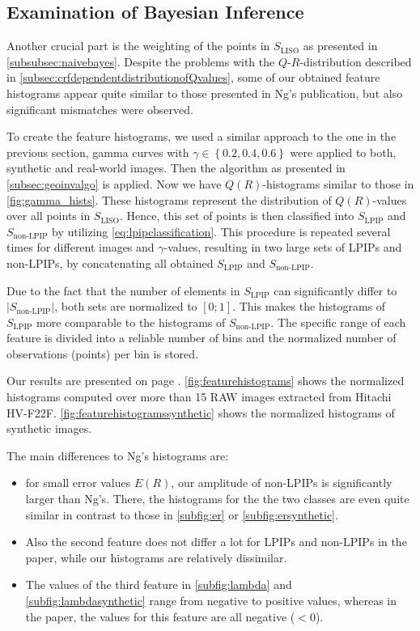 \clearpage

\subsection{Examination of Bayesian Inference}
\label{subsec:examinationofbayesianinf}

Another crucial part is the weighting of the points in $S_\text{LISO}$ as presented in \autoref{subsubsec:naivebayes}. Despite the problems with the $Q$-$R$-distribution described in \autoref{subsec:crfdependentdistributionofQvalues}, some of our obtained feature histograms appear quite similar to those presented in Ng's publication, but also significant mismatches were observed.

To create the feature histograms, we used a similar approach to the one in the previous section, gamma curves with $\gamma \in \left\{0.2, 0.4, 0.6\right\}$ were applied to both, synthetic and real-world images. Then the algorithm as presented in \autoref{subsec:geoinvalgo} is applied. Now we have $Q(R)$-histograms similar to those in \autoref{fig:gamma_hists}. These histograms represent the distribution of $Q(R)$-values over all points in $S_\text{LISO}$. Hence, this set of points is then classified into $S_\text{LPIP}$ and $S_\text{non-LPIP}$ by utilizing \autoref{eq:lpipclassification}. This procedure is repeated several times for different images and $\gamma$-values, resulting in two large sets of LPIPs and non-LPIPs, by concatenating all obtained $S_\text{LPIP}$ and $S_\text{non-LPIP}$. 

Due to the fact that the number of elements in $S_\text{LPIP}$ can significantly differ to $\left|S_\text{non-LPIP}\right|$, both sets are normalized to $[0; 1]$. This makes the histograms of $S_\text{LPIP}$ more comparable to the histograms of $S_\text{non-LPIP}$. The specific range of each feature is divided into a reliable number of bins and the normalized number of observations (points) per bin is stored. 

Our results are presented on page \pageref{fig:featurehistograms}. \autoref{fig:featurehistograms} shows the normalized histograms computed over more than 15 RAW images extracted from Hitachi HV-F22F. \autoref{fig:featurehistogramssynthetic} shows the normalized histograms of synthetic images.

The main differences to Ng's histograms are:
\begin{itemize}
	\item for small error values $E(R)$, our amplitude of non-LPIPs is significantly larger than Ng's. There, the histograms for the the two classes are even quite similar in contrast to those in \autoref{subfig:er} or \autoref{subfig:ersynthetic}.
	\item Also the second feature does not differ a lot for LPIPs and non-LPIPs in the paper, while our histograms are relatively dissimilar.
	\item The values of the third feature in \autoref{subfig:lambda} and \autoref{subfig:lambdasynthetic} range from negative to positive values, whereas in the paper, the values for this feature are all negative ($< 0$).
\end{itemize}

